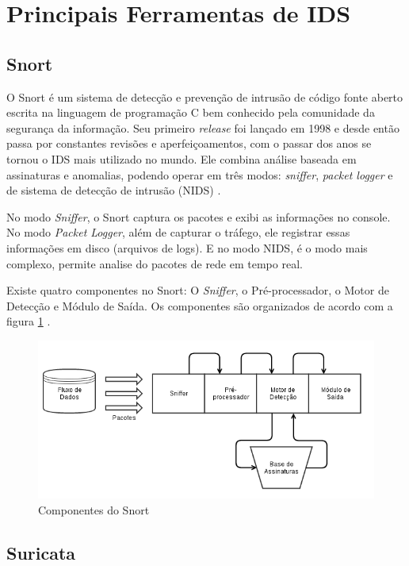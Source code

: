 \documentclass[
	12pt,				
	openright,		
	twoside,	
	a4paper,
	english,	
	brazil	
	]{abntex2}
\begin{document}
\section{Principais Ferramentas de IDS}
\subsection{Snort}

O Snort é um sistema de detecção e prevenção de intrusão de código fonte aberto escrita na linguagem de programação C bem conhecido pela comunidade da segurança da informação. Seu primeiro \textit{release} foi lançado em 1998 e desde então passa por constantes revisões e aperfeiçoamentos, com o passar dos anos se tornou o IDS mais utilizado no mundo. Ele combina análise baseada em assinaturas e anomalias, podendo operar em três modos: \textit{sniffer}, \textit{packet logger} e de sistema de detecção de intrusão (NIDS) \cite{snortorgbr}.

No modo \textit{Sniffer}, o Snort captura os pacotes e exibi as informações no console. No modo \textit{Packet Logger}, além de capturar o tráfego, ele registrar essas informações em disco (arquivos de logs). E no modo NIDS, é o modo mais complexo, permite analise do pacotes de rede em tempo real.

Existe quatro componentes no Snort: O \textit{Sniffer}, o Pré-processador, o Motor de Detecção e Módulo de Saída. Os componentes são organizados de acordo com a figura \ref{snort-componentes} \cite{kohlenberg2007snort}.

\begin{figure}[!htp]
  \centering
  \includegraphics[scale=0.6]{snort_componentes}
  \caption{Componentes do Snort}
  \label{snort-componentes}
\end{figure}

\subsection{Suricata}
\end{document}
